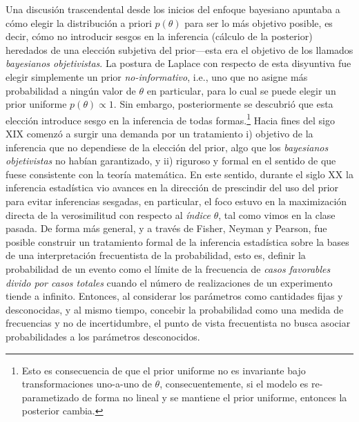 Una discusión trascendental desde los inicios del enfoque bayesiano apuntaba a  cómo elegir la distribución a  priori $p(\theta)$ para ser lo más objetivo posible, es decir, cómo no introducir sesgos en la inferencia (cálculo de la posterior) heredados de una elección subjetiva del prior---esta era el objetivo de los llamados \emph{bayesianos objetivistas}. La postura de Laplace con respecto de esta disyuntiva fue elegir simplemente un prior \emph{no-informativo}, i.e., uno que no asigne más probabilidad a ningún valor de $\theta$ en particular, para lo cual se puede elegir un prior uniforme $p(\theta)\propto 1$. Sin embargo, posteriormente se descubrió que esta elección introduce sesgo en la inferencia de todas formas.\footnote{Esto es consecuencia de que el prior uniforme no es invariante bajo transformaciones uno-a-uno de $\theta$, consecuentemente, si el modelo es re-parametizado de forma no lineal y se mantiene el prior uniforme, entonces la posterior cambia.} Hacia fines del sigo XIX comenzó a surgir una demanda por un tratamiento i) objetivo de la inferencia que no dependiese de la elección del prior, algo que los \emph{bayesianos objetivistas} no habían garantizado, y ii) riguroso y formal en el sentido de que fuese consistente con la teoría matemática. En este sentido, durante el siglo XX la inferencia estadística vio avances en la dirección de prescindir del uso del prior para evitar inferencias sesgadas, en particular, el foco estuvo en la maximización directa de la verosimilitud con respecto al \emph{índice} $\theta$, tal como vimos en la clase pasada. De forma más general, y a través de Fisher, Neyman y Pearson, fue posible construir un tratamiento formal de la inferencia estadística sobre la bases de una interpretación frecuentista de la probabilidad, esto es, definir la probabilidad de un evento como el límite de la frecuencia de \emph{casos favorables divido por casos totales} cuando el número de realizaciones de un experimento tiende a infinito. Entonces, al considerar los parámetros como cantidades fijas y desconocidas, y al mismo tiempo, concebir la probabilidad como una medida de frecuencias y no de incertidumbre, el punto de vista frecuentista no busca asociar probabilidades a los parámetros desconocidos.

